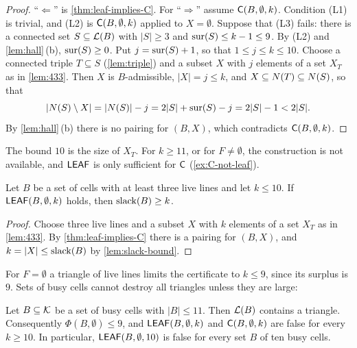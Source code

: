 \begin{proof}
``$\Leftarrow$'' is \cref{thm:leaf-implies-C}. For ``$\Rightarrow$'' assume $\mathsf{C}(B,\emptyset,k)$. Condition
(L1) is trivial, and (L2) is $\mathsf{C}(B,\emptyset,k)$ applied to $X=\emptyset$. Suppose that (L3) fails: there is
a connected set $S\subseteq\mathcal{L}(B)$ with $|S|\ge 3$ and $\operatorname{sur}(S)\le k-1\le 9$. By (L2) and
\cref{lem:hall}\,(b), $\operatorname{sur}(S)\ge 0$. Put $j=\operatorname{sur}(S)+1$, so that $1\le j\le k\le 10$. Choose a connected
triple $T\subseteq S$ (\cref{lem:triple}) and a subset $X$ with $j$ elements of a set $X_T$ as in
\cref{lem:433}. Then $X$ is $B$-admissible, $|X|=j\le k$, and $X\subseteq N(T)\subseteq N(S)$, so that
\[
  |N(S)\setminus X|=|N(S)|-j=2|S|+\operatorname{sur}(S)-j=2|S|-1<2|S| .
\]
By \cref{lem:hall}\,(b) there is no pairing for $(B,X)$, which contradicts $\mathsf{C}(B,\emptyset,k)$.
\end{proof}

The bound $10$ is the size of $X_T$. For $k\ge 11$, or for $F\ne\emptyset$, the construction is not
available, and $\mathsf{LEAF}$ is only sufficient for $\mathsf{C}$ (\cref{ex:C-not-leaf}).

\begin{corollary}\label{cor:slack-necessary}
Let $B$ be a set of cells with at least three live lines and let $k\le 10$. If $\mathsf{LEAF}(B,\emptyset,k)$
holds, then $\operatorname{slack}(B)\ge k$.
\end{corollary}

\begin{proof}
Choose three live lines and a subset $X$ with $k$ elements of a set $X_T$ as in \cref{lem:433}. By
\cref{thm:leaf-implies-C} there is a pairing for $(B,X)$, and $k=|X|\le\operatorname{slack}(B)$ by
\cref{lem:slack-bound}.
\end{proof}

For $F=\emptyset$ a triangle of live lines limits the certificate to $k\le 9$, since its surplus is $9$.
Sets of busy cells cannot destroy all triangles unless they are large:

\begin{proposition}\label{prop:busy10}
Let $B\subseteq\mathcal{K}$ be a set of busy cells with $|B|\le 11$. Then $\mathcal{L}(B)$ contains a triangle.
Consequently $\Phi(B,\emptyset)\le 9$, and $\mathsf{LEAF}(B,\emptyset,k)$ and $\mathsf{C}(B,\emptyset,k)$ are false for
every $k\ge 10$. In particular, $\mathsf{LEAF}(B,\emptyset,10)$ is false for every set $B$ of ten busy cells.
\end{proposition}

